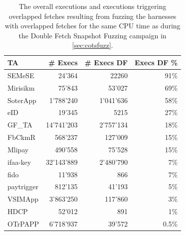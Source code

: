 \documentclass[conference]{IEEEtran}
\newcommand{\stagetwo}{Double Fetch Snapshot Fuzzing\xspace}
\newcommand{\eighteigthce}{Mlipay\xspace}
\newcommand{\aseventhreefour}{GF\_TA\xspace}
\newcommand{\sixfivefivea}{OTrPAPP\xspace}
\newcommand{\eightaaa}{Mirisikm\xspace}
\newcommand{\zeroeightzeroone}{ifaa-key\xspace}
\newcommand{\onefourbzero}{fido\xspace}
\newcommand{\dfonee}{paytrigger\xspace}
\newcommand{\fivethreefourfive}{SEMeSE\xspace}
\newcommand{\anineeightfive}{eID\xspace}
\newcommand{\foureightfourfour}{HDCP\xspace}
\newcommand{\foursixsixtwo}{FbCkmR\xspace}
\newcommand{\threesevensevene}{SoterApp\xspace}
\newcommand{\threedzeroeight}{VSIMApp\xspace}
\newcommand{\numexecseighteightce}{490'558\xspace}
\newcommand{\numexecsdfeighteightce}{75'528\xspace}
\newcommand{\numexecsdfperceighteightce}{15\%\xspace}
\newcommand{\numexecsaseventhreefour}{14'741'203\xspace}
\newcommand{\numexecsdfaseventhreefour}{2'757'134\xspace}
\newcommand{\numexecsdfpercaseventhreefour}{18\%\xspace}
\newcommand{\numexecssixfivefivea}{6'718'937\xspace}
\newcommand{\numexecsdfsixfivefivea}{39'572\xspace}
\newcommand{\numexecsdfpercsixfivefivea}{0.5\%\xspace}
\newcommand{\numexecseightaaa}{75'843\xspace}
\newcommand{\numexecsdfeightaaa}{53'027\xspace}
\newcommand{\numexecsdfperceightaaa}{69\%\xspace}
\newcommand{\numexecszeroeightzeroone}{32'143'889\xspace}
\newcommand{\numexecsdfzeroeightzeroone}{2'480'790\xspace}
\newcommand{\numexecsdfperczeroeightzeroone}{7\%\xspace}
\newcommand{\numexecsonefourbzero}{11'938\xspace}
\newcommand{\numexecsdfonefourbzero}{866\xspace}
\newcommand{\numexecsdfperconefourbzero}{7\%\xspace}
\newcommand{\numexecsdfonee}{812'135\xspace}
\newcommand{\numexecsdfdfonee}{41'193\xspace}
\newcommand{\numexecsdfpercdfonee}{5\%\xspace}
\newcommand{\numexecsfivethreefourfive}{24'364\xspace}
\newcommand{\numexecsdffivethreefourfive}{22260\xspace}
\newcommand{\numexecsdfpercfivethreefourfive}{91\%\xspace}
\newcommand{\numexecsanineeightfive}{19'345\xspace}
\newcommand{\numexecsdfanineeightfive}{5215\xspace}
\newcommand{\numexecsdfpercanineeightfive}{27\%\xspace}
\newcommand{\numexecsfoureightfourfour}{52'012\xspace}
\newcommand{\numexecsdffoureightfourfour}{891\xspace}
\newcommand{\numexecsdfpercfoureightfourfour}{1\%\xspace}
\newcommand{\numexecsthreedzeroeight}{3'863'250\xspace}
\newcommand{\numexecsdfthreedzeroeight}{117'860\xspace}
\newcommand{\numexecsdfpercthreedzeroeight}{3\%\xspace}
\newcommand{\numexecsfoursixsixtwo}{568'237\xspace}
\newcommand{\numexecsdffoursixsixtwo}{127'009\xspace}
\newcommand{\numexecsdfpercfoursixsixtwo}{15\%\xspace}
\newcommand{\numexecsthreesevensevene}{1'788'240\xspace}
\newcommand{\numexecsdfthreesevensevene}{1'041'636\xspace}
\newcommand{\numexecsdfpercthreesevensevene}{58\%\xspace}
\begin{document}
\begin{table}[t]
    \footnotesize
    \centering
    \begin{tabular}{lrrr}
        \toprule
        TA&
        \# Execs &
        \# Execs DF &
        Execs DF \%\\
        \toprule
        \fivethreefourfive & \numexecsfivethreefourfive &\numexecsdffivethreefourfive  & \numexecsdfpercfivethreefourfive\\
        \eightaaa & \numexecseightaaa &\numexecsdfeightaaa  & \numexecsdfperceightaaa\\
        \threesevensevene & \numexecsthreesevensevene &\numexecsdfthreesevensevene  &\numexecsdfpercthreesevensevene\\
        \anineeightfive & \numexecsanineeightfive &\numexecsdfanineeightfive  &\numexecsdfpercanineeightfive\\
        \aseventhreefour & \numexecsaseventhreefour &\numexecsdfaseventhreefour  &\numexecsdfpercaseventhreefour\\
        \foursixsixtwo & \numexecsfoursixsixtwo &\numexecsdffoursixsixtwo  &\numexecsdfpercfoursixsixtwo\\
        \eighteigthce & \numexecseighteightce  & \numexecsdfeighteightce &\numexecsdfperceighteightce\\
        \zeroeightzeroone & \numexecszeroeightzeroone &\numexecsdfzeroeightzeroone  &\numexecsdfperczeroeightzeroone\\
        \onefourbzero & \numexecsonefourbzero &\numexecsdfonefourbzero  &\numexecsdfperconefourbzero\\
        \dfonee & \numexecsdfonee &\numexecsdfdfonee  &\numexecsdfpercdfonee\\
        \threedzeroeight & \numexecsthreedzeroeight  & \numexecsdfthreedzeroeight &\numexecsdfpercthreedzeroeight\\
        \foureightfourfour & \numexecsfoureightfourfour &\numexecsdffoureightfourfour  &\numexecsdfpercfoureightfourfour\\
        \sixfivefivea & \numexecssixfivefivea &\numexecsdfsixfivefivea  &\numexecsdfpercsixfivefivea\\
        
        \bottomrule
    \end{tabular}
    \caption{
        The overall executions and executions triggering overlapped fetches resulting from fuzzing the harnesses with overlapped 
        fetches for the same CPU time as during the \stagetwo campaign in \autoref{sec:cotsfuzz}. 
    }
    \label{tab:reshape}
\end{table}
\end{document}
